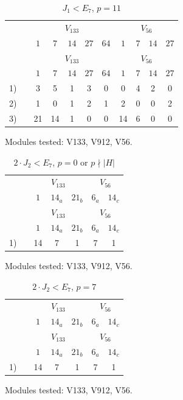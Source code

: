 \setcounter{table}{151}
\begin{longtable}{rc|ccccc|cccc}
\caption{$J_{1} < E_7$, $p = 11$}\\
& & \multicolumn{5}{c|}{$V_{133}$} & \multicolumn{4}{c}{$V_{56}$} \\
& & $1$ & $7$ & $14$ & $27$ & $64$ & $1$ & $7$ & $14$ & $27$ \\ \hline
\endfirsthead
& & \multicolumn{5}{c|}{$V_{133}$} & \multicolumn{4}{c}{$V_{56}$} \\
& & $1$ & $7$ & $14$ & $27$ & $64$ & $1$ & $7$ & $14$ & $27$ \\ \hline
\endhead
1) &  & 3 & 5 & 1 & 3 & 0 & 0 & 4 & 2 & 0 \\
2) &  & 1 & 0 & 1 & 2 & 1 & 2 & 0 & 0 & 2 \\
3) &  & 21 & 14 & 1 & 0 & 0 & 14 & 6 & 0 & 0 \\
\end{longtable}
\noindent Modules tested: V133, V912, V56.\\

\setcounter{table}{152}
\begin{longtable}{rc|ccc|cc}
\caption{$2 \cdot J_{2} < E_7$, $p = 0$ or $p \nmid |H|$}\\
& & \multicolumn{3}{c|}{$V_{133}$} & \multicolumn{2}{c}{$V_{56}$} \\
& & $1$ & $14_{a}$ & $21_{b}$ & $6_{a}$ & $14_{c}$ \\ \hline
\endfirsthead
& & \multicolumn{3}{c|}{$V_{133}$} & \multicolumn{2}{c}{$V_{56}$} \\
& & $1$ & $14_{a}$ & $21_{b}$ & $6_{a}$ & $14_{c}$ \\ \hline
\endhead
1) &  & 14 & 7 & 1 & 7 & 1 \\
\end{longtable}
\noindent Modules tested: V133, V912, V56.\\

\setcounter{table}{153}
\begin{longtable}{rc|ccc|cc}
\caption{$2 \cdot J_{2} < E_7$, $p = 7$}\\
& & \multicolumn{3}{c|}{$V_{133}$} & \multicolumn{2}{c}{$V_{56}$} \\
& & $1$ & $14_{a}$ & $21_{b}$ & $6_{a}$ & $14_{c}$ \\ \hline
\endfirsthead
& & \multicolumn{3}{c|}{$V_{133}$} & \multicolumn{2}{c}{$V_{56}$} \\
& & $1$ & $14_{a}$ & $21_{b}$ & $6_{a}$ & $14_{c}$ \\ \hline
\endhead
1) &  & 14 & 7 & 1 & 7 & 1 \\
\end{longtable}
\noindent Modules tested: V133, V912, V56.\\


